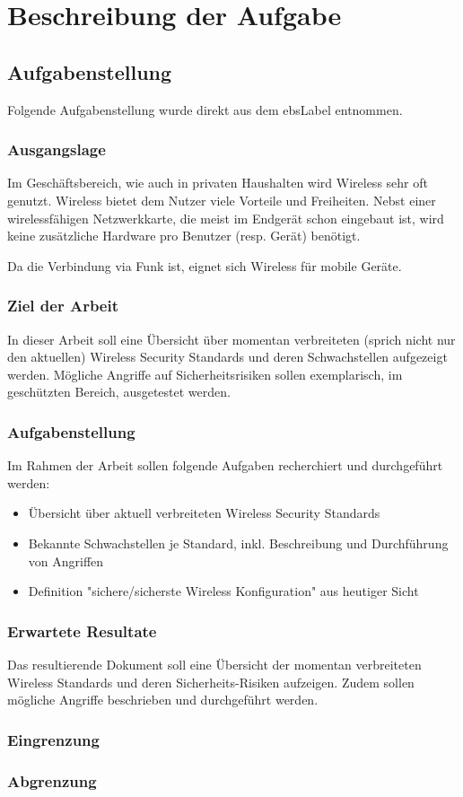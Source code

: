 \chapter{Beschreibung der Aufgabe}

\section{Aufgabenstellung}
Folgende Aufgabenstellung wurde direkt aus dem \gls{ebsLabel} entnommen.

\subsection{Ausgangslage}
Im Geschäftsbereich, wie auch in privaten Haushalten wird Wireless sehr oft genutzt.
Wireless bietet dem Nutzer viele Vorteile und Freiheiten. Nebst einer wirelessfähigen Netzwerkkarte, die meist im Endgerät schon eingebaut ist, wird keine zusätzliche Hardware pro Benutzer (resp. Gerät) benötigt.

Da die Verbindung via Funk ist, eignet sich Wireless für mobile Geräte.

\subsection{Ziel der Arbeit}
In dieser Arbeit soll eine Übersicht über momentan verbreiteten (sprich nicht nur den aktuellen) Wireless Security Standards und deren Schwachstellen aufgezeigt werden.
Mögliche Angriffe auf Sicherheitsrisiken sollen exemplarisch, im geschützten Bereich, ausgetestet werden.

\subsection{Aufgabenstellung}
Im Rahmen der Arbeit sollen folgende Aufgaben recherchiert und durchgeführt werden:
\begin{itemize}
	\item Übersicht über aktuell verbreiteten Wireless Security Standards
	\item Bekannte Schwachstellen je Standard, inkl. Beschreibung und Durchführung von Angriffen
	\item Definition "sichere/sicherste Wireless Konfiguration" aus heutiger Sicht
\end{itemize}

\subsection{Erwartete Resultate}
Das resultierende Dokument soll eine Übersicht der momentan verbreiteten Wireless Standards und deren Sicherheits-Risiken aufzeigen.
Zudem sollen mögliche Angriffe beschrieben und durchgeführt werden.


\subsection{Eingrenzung}

\subsection{Abgrenzung}

